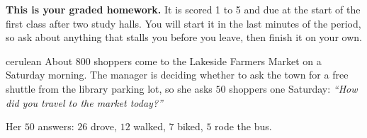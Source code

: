 \documentclass[12pt]{article}
\begin{document}

\vspace{0.12in}

\begin{remindbox}
\small
\textbf{This is your graded homework.} It is scored 1 to 5 and due at the start of the
first class after two study halls. You will start it in the last minutes of the period, so ask about anything that stalls
you before you leave, then finish it on your own.
\end{remindbox}

\vspace{0.08in}

\boxguard[20]
\begin{scenariobox}{cerulean}
About $800$ shoppers come to the Lakeside Farmers Market on a Saturday morning. The manager is
deciding whether to ask the town for a free shuttle from the library parking lot, so she asks
$50$ shoppers one Saturday: \emph{``How did you travel to the market today?''}

\vspace{2pt}
Her $50$ answers: $26$ drove, $12$ walked, $7$ biked, $5$ rode the bus.
\end{scenariobox}

\vspace{0.08in}
\end{document}
